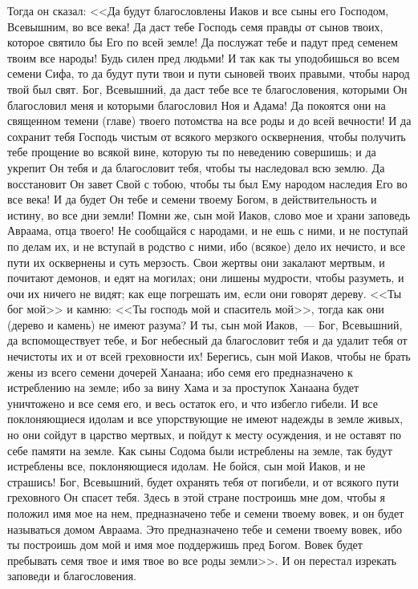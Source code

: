 Тогда он сказал: <<Да будут благословлены
Иаков и все сыны его Господом, Всевышним, во все
века! Да даст тебе Господь семя правды от сынов
твоих, которое святило бы Его по всей земле!
Да послужат тебе и падут пред семенем твоим все
народы! Будь силен пред людьми! И так как ты
уподобишься во всем семени Сифа, то да будут пути
твои и пути сыновей твоих правыми, чтобы народ
твой был свят. Бог, Всевышний, да даст тебе все те
благословения, которыми Он благословил меня и
которыми благословил Ноя и Адама! Да покоятся они
на священном темени (главе) твоего потомства на
все роды и до всей вечности! И да сохранит тебя
Господь чистым от всякого мерзкого осквернения,
чтобы получить тебе прощение во всякой вине,
которую ты по неведению совершишь; и да укрепит
Он тебя и да благословит тебя, чтобы ты
наследовал всю землю. Да восстановит Он завет
Свой с тобою, чтобы ты был Ему народом наследия
Его во все века! И да будет Он тебе и семени твоему
Богом, в действительность и истину, во все дни
земли! Помни же, сын мой Иаков, слово мое и храни
заповедь Авраама, отца твоего! Не сообщайся с
народами, и не ешь с ними, и не поступай по делам
их, и не вступай в родство с ними, ибо (всякое) дело
их нечисто, и все пути их осквернены и суть
мерзость. Свои жертвы они закалают мертвым, и
почитают демонов, и едят на могилах; они лишены
мудрости, чтобы разуметь, и очи их ничего не
видят; как еще погрешать им, если они говорят
дереву. <<Ты бог мой>> и камню: <<Ты господь
мой и спаситель мой>>, тогда как они (дерево и
камень) не имеют разума? И ты, сын мой Иаков,~--- Бог,
Всевышний, да вспомоществует тебе, и Бог небесный
да благословит тебя и да удалит тебя от нечистоты
их и от всей греховности их! Берегись, сын мой
Иаков, чтобы не брать жены из всего семени
дочерей Ханаана; ибо семя его предназначено к
истреблению на земле; ибо за вину Хама и за
проступок Ханаана будет уничтожено и все семя
его, и весь остаток его, и что избегло гибели. И
все поклоняющиеся идолам и все упорствующие не
имеют надежды в земле живых, но они сойдут в
царство мертвых, и пойдут к месту осуждения, и не
оставят по себе памяти на земле. Как сыны Содома
были истреблены на земле, так будут истреблены
все, поклоняющиеся идолам. Не бойся, сын мой
Иаков, и не страшись! Бог, Всевышний, будет
охранять тебя от погибели, и от всякого пути
греховного Он спасет тебя. Здесь в этой стране построишь
мне дом, чтобы я положил имя мое на нем,
предназначено тебе и семени твоему вовек, и он
будет называться домом Авраама. Это
предназначено тебе и семени твоему вовек, ибо ты
построишь дом мой и имя мое поддержишь пред
Богом. Вовек будет пребывать семя твое и имя твое
во все роды земли>>. И он перестал изрекать
заповеди и благословения.

